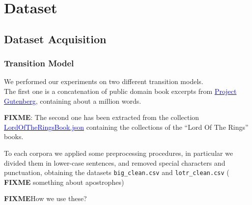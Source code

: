 \chapter{Dataset}

\section{Dataset Acquisition}
\label{section:dataset-exploration}

\subsection{Transition Model}
\label{subsection:transmodel}
We performed our experiments on two different transition models.\\
The first one is a concatenation of public domain book excerpts from \href{http://www.gutenberg.org/wiki/Main_Page}{ 
	\textcolor{blue}{Project Gutenberg}}, containing about a million words. 

\textbf{FIXME}:{
The second one has been extracted from the collection  
\href{https://www.kaggle.com/mokosan/lord-of-the-rings-character-data#LordOfTheRingsBook.json}{ 
	\textcolor{blue}{LordOfTheRingsBook.json}} containing the collections of the “Lord Of The Rings” books.}

To each corpora we applied some preprocessing procedures, in particular we divided them in lower-case sentences, and 
removed special characters and punctuation, obtaining the datasets \texttt{big\_clean.csv} and \texttt{lotr\_clean.csv} ( 
\textbf{FIXME }something about apostrophes)


\textbf{FIXME}{How we use these?}

